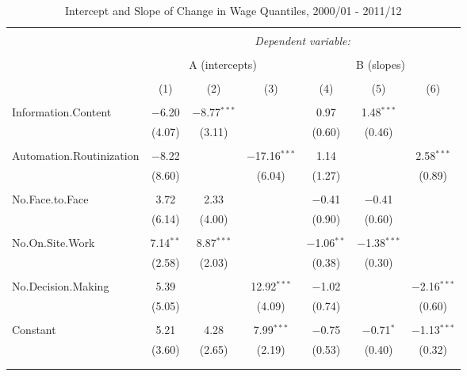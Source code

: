 \documentclass{article}
\begin{document}
\begin{table}[!htbp] \centering 
  \caption{Intercept and Slope of Change in Wage Quantiles, 2000/01 - 2011/12} 
  \label{} 
\begin{tabular}{@{\extracolsep{5pt}}lcccccc} 
\\[-1.8ex]\hline 
\hline \\[-1.8ex] 
 & \multicolumn{6}{c}{\textit{Dependent variable:}} \\ 
\cline{2-7} 
\\[-1.8ex] & \multicolumn{3}{c}{A (intercepts)} & \multicolumn{3}{c}{B (slopes)} \\ 
\\[-1.8ex] & (1) & (2) & (3) & (4) & (5) & (6)\\ 
\hline \\[-1.8ex] 
 Information.Content & $-$6.20 & $-$8.77$^{***}$ &  & 0.97 & 1.48$^{***}$ &  \\ 
  & (4.07) & (3.11) &  & (0.60) & (0.46) &  \\ 
  & & & & & & \\ 
 Automation.Routinization & $-$8.22 &  & $-$17.16$^{***}$ & 1.14 &  & 2.58$^{***}$ \\ 
  & (8.60) &  & (6.04) & (1.27) &  & (0.89) \\ 
  & & & & & & \\ 
 No.Face.to.Face & 3.72 & 2.33 &  & $-$0.41 & $-$0.41 &  \\ 
  & (6.14) & (4.00) &  & (0.90) & (0.60) &  \\ 
  & & & & & & \\ 
 No.On.Site.Work & 7.14$^{**}$ & 8.87$^{***}$ &  & $-$1.06$^{**}$ & $-$1.38$^{***}$ &  \\ 
  & (2.58) & (2.03) &  & (0.38) & (0.30) &  \\ 
  & & & & & & \\ 
 No.Decision.Making & 5.39 &  & 12.92$^{***}$ & $-$1.02 &  & $-$2.16$^{***}$ \\ 
  & (5.05) &  & (4.09) & (0.74) &  & (0.60) \\ 
  & & & & & & \\ 
 Constant & 5.21 & 4.28 & 7.99$^{***}$ & $-$0.75 & $-$0.71$^{*}$ & $-$1.13$^{***}$ \\ 
  & (3.60) & (2.65) & (2.19) & (0.53) & (0.40) & (0.32) \\ 
  & & & & & & \\ 
\hline \\[-1.8ex] 

\end{tabular}
\end{table}
\end{document}
